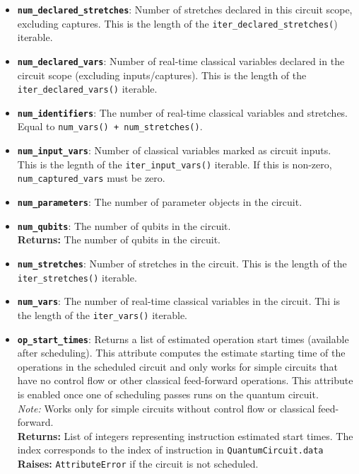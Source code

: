 \begin{itemize}
    \item \textbf{\texttt{num\_declared\_stretches}}: Number of stretches declared in this circuit scope, excluding captures. This is the length of the \texttt{iter\_declared\_stretches(}) iterable.

    \item \textbf{\texttt{num\_declared\_vars}}: Number of real-time classical variables declared in the circuit scope (excluding inputs/captures). This is the length of the \texttt{iter\_declared\_vars()} iterable.

    \item \textbf{\texttt{num\_identifiers}}: The number of real-time classical variables and stretches.\\
    Equal to \texttt{num\_vars() + num\_stretches()}.

    \item \textbf{\texttt{num\_input\_vars}}: Number of classical variables marked as circuit inputs.\\
    This is the legnth of the \texttt{iter\_input\_vars()} iterable. If this is non-zero, \texttt{num\_captured\_vars} must be zero.

    \item \textbf{\texttt{num\_parameters}}: The number of parameter objects in the circuit.

    \item \textbf{\texttt{num\_qubits}}: The number of qubits in the circuit.\\
    \textbf{Returns:} The number of qubits in the circuit.

    \item \textbf{\texttt{num\_stretches}}: Number of stretches in the circuit. This is the length of the \texttt{iter\_stretches()} iterable.

    \item \textbf{\texttt{num\_vars}}: The number of real-time classical variables in the circuit. Thi is the length of the \texttt{iter\_vars()} iterable.

    \item \textbf{\texttt{op\_start\_times}}: Returns a list of estimated operation start times (available after scheduling). This attribute computes the estimate starting time of the operations in the scheduled circuit and only works for simple circuits that have no control flow or other classical feed-forward operations. This attribute is enabled once one of scheduling passes runs on the quantum circuit.\\
    \textit{Note:} Works only for simple circuits without control flow or classical feed-forward.\\
    \textbf{Returns:} List of integers representing instruction estimated start times. The index corresponds to the index of instruction in \texttt{QuantumCircuit.data}
    \textbf{Raises:} \texttt{AttributeError} if the circuit is not scheduled.


\end{itemize}
